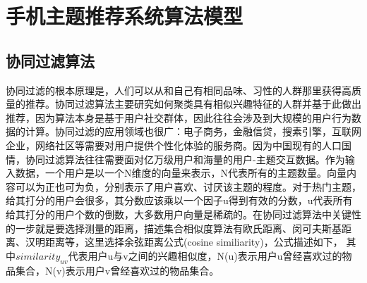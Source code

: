 		\begin{figure}
		\centering
		  \label{pic:hl_recommend}
		\end{figure}

	\section{手机主题推荐系统算法模型}
		\subsection{协同过滤算法}
		协同过滤的根本原理是，人们可以从和自己有相同品味、习性的人群那里获得高质量的推荐。协同过滤算法主要研究如何聚类具有相似兴趣特征的人群并基于此做出推荐，因为算法本身是基于用户社交群体，因此往往会涉及到大规模的用户行为数据的计算。协同过滤的应用领域也很广：电子商务，金融信贷，搜素引擎，互联网企业，网络社区等需要对用户提供个性化体验的服务商。因为中国现有的人口国情，协同过滤算法往往需要面对亿万级用户和海量的用户-主题交互数据。作为输入数据，一个用户是以一个N维度的向量来表示，N代表所有的主题数量。向量内容可以为正也可为负，分别表示了用户喜欢、讨厌该主题的程度。对于热门主题，给其打分的用户会很多，其分数应该乘以一个因子u得到有效的分数，u代表所有给其打分的用户个数的倒数，大多数用户向量是稀疏的。在协同过滤算法中关键性的一步就是要选择测量的距离，描述集合相似度算法有欧氏距离、闵可夫斯基距离、汉明距离等，这里选择余弦距离公式(cosine similiarity)，公式描述如下，
		其中$similarity_{uv}$代表用户u与v之间的兴趣相似度，N(u)表示用户u曾经喜欢过的物品集合，N(v)表示用户v曾经喜欢过的物品集合。

